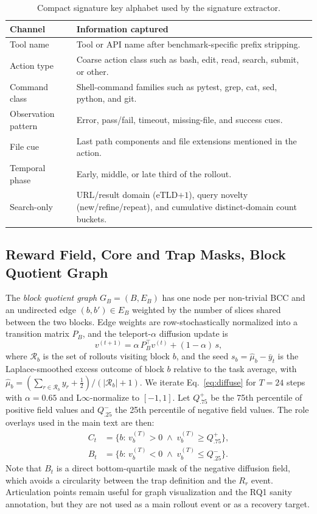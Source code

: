 \begin{table}[h]
\centering
\scriptsize
\setlength{\tabcolsep}{3pt}
\begin{tabularx}{\linewidth}{lX}
\toprule
\textbf{Channel} & \textbf{Information captured} \\
\midrule
Tool name & Tool or API name after benchmark-specific prefix stripping. \\
Action type & Coarse action class such as bash, edit, read, search, submit, or other. \\
Command class & Shell-command families such as pytest, grep, cat, sed, python, and git. \\
Observation pattern & Error, pass/fail, timeout, missing-file, and success cues. \\
File cue & Last path components and file extensions mentioned in the action. \\
Temporal phase & Early, middle, or late third of the rollout. \\
Search-only & URL/result domain (eTLD$+1$), query novelty (new/refine/repeat), and cumulative distinct-domain count buckets. \\
\bottomrule
\end{tabularx}
\caption{Compact signature key alphabet used by the signature extractor.}
\label{tab:keys}
\end{table}


\subsection{Reward Field, Core and Trap Masks, Block Quotient Graph}
\label{app:roles_math}

The \emph{block quotient graph} $G_B=(B,E_B)$ has one node per non-trivial BCC and an undirected edge $(b,b')\in E_B$ weighted by the number of slices shared between the two blocks.
Edge weights are row-stochastically normalized into a transition matrix $P_B$, and the teleport-$\alpha$ diffusion update is
\begin{equation}
v^{(t+1)} = \alpha\, P_B^{\top} v^{(t)} + (1-\alpha)\, s,
\label{eq:diffuse}
\end{equation}
where $\mathcal{R}_b$ is the set of rollouts visiting block $b$, and the seed $s_b=\hat\mu_b-\bar y_t$ is the Laplace-smoothed excess outcome of block $b$ relative to the task average, with $\hat\mu_b=(\sum_{r\in\mathcal{R}_b} y_r+\tfrac{1}{2})/(|\mathcal{R}_b|+1)$.
We iterate Eq.~\ref{eq:diffuse} for $T=24$ steps with $\alpha=0.65$ and L$\infty$-normalize to $[-1,1]$.
Let $Q^+_{.75}$ be the 75th percentile of positive field values and $Q^-_{.25}$ the 25th percentile of negative field values.
The role overlays used in the main text are then:
\begin{align}
C_t &= \{b:\, v^{(T)}_b>0 \;\wedge\; v^{(T)}_b\geq Q^+_{.75}\}, \\
B_t &= \{b:\, v^{(T)}_b<0 \;\wedge\; v^{(T)}_b\leq Q^-_{.25}\}.
\end{align}
Note that $B_t$ is a direct bottom-quartile mask of the negative diffusion field, which avoids a circularity between the trap definition and the $R_r$ event.
Articulation points remain useful for graph visualization and the RQ1 sanity annotation, but they are not used as a main rollout event or as a recovery target.
